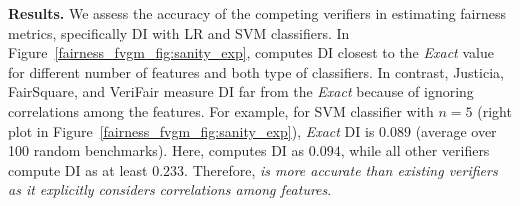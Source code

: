 \textbf{Results.} 
 We  assess the accuracy of the competing verifiers in estimating fairness metrics, specifically DI with LR and SVM classifiers. In Figure~\ref{fairness_fvgm_fig:sanity_exp}, {\fvgm} computes DI closest to the \textit{Exact} value for different number of features and both type of classifiers. In contrast, Justicia, FairSquare, and VeriFair measure DI far from the \textit{Exact} because of ignoring correlations among the features. For example, for SVM classifier with  $ n = 5 $ (right plot in Figure~\ref{fairness_fvgm_fig:sanity_exp}), \textit{Exact} DI is $ 0.089 $ (average over 100 random benchmarks). Here, {\fvgm} computes DI as $ 0.094 $, while all other verifiers compute DI as at least $ 0.233 $. Therefore, \textit{{\fvgm} is more accurate than existing verifiers as it explicitly considers correlations among features}. 


